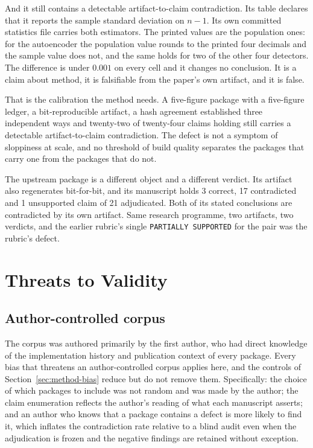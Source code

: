 \documentclass[sigconf,review]{acmart}
\begin{document}
And it still contains a detectable artifact-to-claim contradiction. Its table
declares that it reports the sample standard deviation on $n-1$. Its own
committed statistics file carries both estimators. The printed values are the
population ones: for the autoencoder the population value rounds to the
printed four decimals and the sample value does not, and the same holds for
two of the other four detectors. The difference is under $0.001$ on every
cell and it changes no conclusion. It is a claim about method, it is
falsifiable from the paper's own artifact, and it is false.

That is the calibration the method needs. A five-figure package with a
five-figure ledger, a bit-reproducible artifact, a hash agreement established
three independent ways and twenty-two of twenty-four claims holding still
carries a detectable artifact-to-claim contradiction. The defect is not a
symptom of sloppiness at scale, and no threshold of build quality separates
the packages that carry one from the packages that do not.

The upstream package is a different object and a different verdict. Its
artifact also regenerates bit-for-bit, and its manuscript holds 3 correct, 17
contradicted and 1 unsupported claim of 21 adjudicated. Both of its stated
conclusions are contradicted by its own artifact. Same research programme, two
artifacts, two verdicts, and the earlier rubric's single
\texttt{PARTIALLY SUPPORTED} for the pair was the rubric's defect.

\section{Threats to Validity}
\label{sec:threats}

\subsection{Author-controlled corpus}
\label{sec:threat-corpus}

The corpus was authored primarily by the first author, who had direct
knowledge of the implementation history and publication context of every
package. Every bias that threatens an author-controlled corpus applies here,
and the controls of Section~\ref{sec:method-bias} reduce but do not remove
them. Specifically: the choice of which packages to include was not random and
was made by the author; the claim enumeration reflects the author's reading of
what each manuscript asserts; and an author who knows that a package contains
a defect is more likely to find it, which inflates the contradiction rate
relative to a blind audit even when the adjudication is frozen and the
negative findings are retained without exception.
\end{document}
